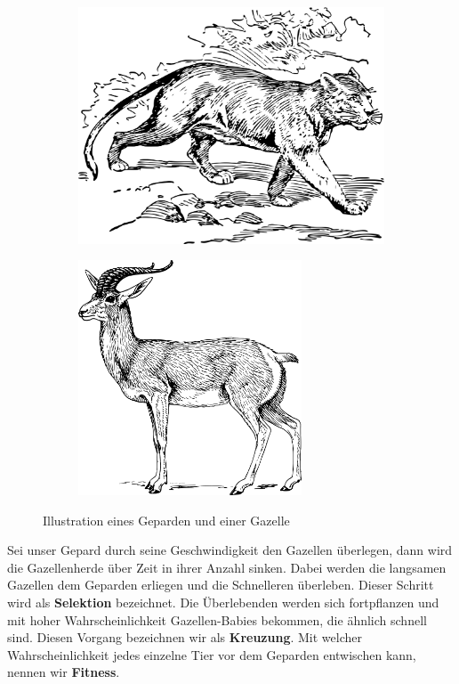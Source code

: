         \begin{figure}[htbp]
            \begin{subfigure}{0.5\textwidth}
                \includegraphics[width = 1\textwidth, left]{../pictures/cheetah.png}
            \end{subfigure}
            \begin{subfigure}{0.5\textwidth}
                \includegraphics[width = 0.73\textwidth, right]{../pictures/gazelle.png}
            \end{subfigure}
            \caption{Illustration eines Geparden und einer Gazelle \label{fig:gazelleAndGepard}}
        \end{figure}
        \noindent
        Sei unser Gepard durch seine Geschwindigkeit den Gazellen überlegen, dann wird die Gazellenherde über Zeit in ihrer Anzahl sinken. Dabei werden die langsamen Gazellen dem Geparden erliegen und die Schnelleren überleben. Dieser Schritt wird als \textbf{Selektion} bezeichnet. Die Überlebenden werden sich fortpflanzen und mit hoher Wahrscheinlichkeit Gazellen-Babies bekommen, die ähnlich schnell sind. Diesen Vorgang bezeichnen wir als \textbf{Kreuzung}. Mit welcher Wahrscheinlichkeit jedes einzelne Tier vor dem Geparden entwischen kann, nennen wir \textbf{Fitness}.\\

